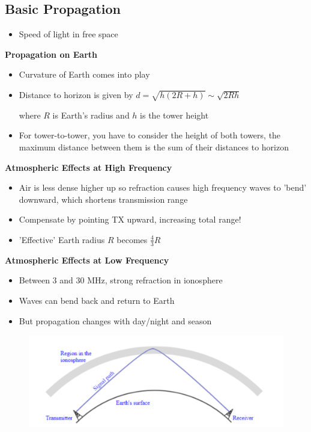 \documentclass[12pt]{article}
\begin{document}
\begin{flushright}[Lecture on 2.2]\end{flushright}

\subsection{Basic Propagation}

\begin{itemize}[noitemsep]
    \item Speed of light in free space
\end{itemize}

\textbf{Propagation on Earth}
\begin{itemize}[noitemsep]
    \item Curvature of Earth comes into play
    \item Distance to horizon is given by $d=\sqrt{h(2R+h)}\sim \sqrt{2Rh}$
    
    where $R$ is Earth's radius and $h$ is the tower height
    \item For tower-to-tower, you have to consider the height of both towers, the maximum distance between them is the sum of their distances to horizon
\end{itemize}

\textbf{Atmospheric Effects at High Frequency}
\begin{itemize}[noitemsep]
    \item Air is less dense higher up so refraction causes high frequency waves to 'bend' downward, which shortens transmission range
    \item Compensate by pointing TX upward, increasing total range!
    \item 'Effective' Earth radius $R$ becomes $\frac{4}{3} R$
\end{itemize}

\textbf{Atmospheric Effects at Low Frequency}
\begin{itemize}[noitemsep]
    \item Between 3 and 30 MHz, strong refraction in ionosphere
    \item Waves can bend back and return to Earth
    \item But propagation changes with day/night and season
\end{itemize}
\begin{figure}[h!]
    \centering
    \includegraphics[width=0.5\linewidth]{images/image4.png}
\end{figure}
\end{document}
